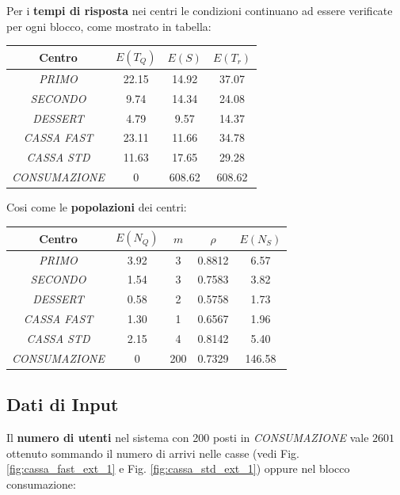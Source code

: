 \documentclass{article}
\newcommand\mP{3}
\newcommand\mS{3}
\newcommand\mD{2}
\newcommand\mF{1}
\newcommand\mC{4}
\begin{document}
Per i \textbf{tempi di risposta} nei centri le condizioni continuano ad essere verificate per ogni blocco, come mostrato in tabella:
\begin{center}
\begin{tabular}{|c|c|c|c|}
 \hline
 \textbf{Centro} & \textbf{$E(T_{Q})$} & \textbf{$E(S)$} & \textbf{$E(T_{r})$}\\
 \hline
 \textit{PRIMO} & 22.15 & 14.92 & 37.07 \\
 \hline
 \textit{SECONDO} & 9.74 & 14.34 & 24.08\\
 \hline
 \textit{DESSERT} & 4.79 & 9.57 & 14.37\\
 \hline
 \textit{CASSA FAST} & 23.11 & 11.66 & 34.78\\
 \hline
 \textit{CASSA STD} & 11.63 & 17.65 & 29.28\\
 \hline
 \textit{CONSUMAZIONE} & 0 & 608.62 & 608.62\\
 \hline
\end{tabular}
\end{center}
Cosi come le \textbf{popolazioni} dei centri:
\begin{center}\label{tab:popolazioni_ext_1}
\begin{tabular}{|c|c|c|c|c|}
 \hline
 \textbf{Centro} & $E(N_{Q})$ & $m$ & $\rho$ & $E(N_{S})$\\
 \hline
 \textit{PRIMO} & 3.92 & \mP & 0.8812 & 6.57\\
 \hline
 \textit{SECONDO} & 1.54 & \mS & 0.7583 & 3.82\\
 \hline
 \textit{DESSERT} & 0.58 & \mD & 0.5758 & 1.73\\
 \hline
 \textit{CASSA FAST} & 1.30 & \mF & 0.6567 & 1.96\\
 \hline
 \textit{CASSA STD} & 2.15 & \mC & 0.8142 & 5.40\\
 \hline
 \textit{CONSUMAZIONE} & 0 & 200 & 0.7329 & 146.58\\
 \hline
\end{tabular}
\end{center}

\subsection{Dati di Input}

Il \textbf{numero di utenti}  nel sistema con 200 posti in \textit{CONSUMAZIONE} vale $2601$ ottenuto sommando il numero di arrivi nelle casse (vedi Fig. \ref{fig:cassa_fast_ext_1} e Fig. \ref{fig:cassa_std_ext_1}) oppure nel blocco consumazione:
\end{document}
